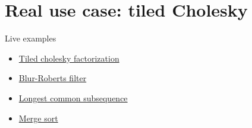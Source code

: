 \documentclass{beamer}
\begin{document}
  


  
  
    


    
    
      

\section{Real use case: tiled Cholesky}

\begin{frame}{Live examples}
  \begin{itemize} 
    \item \href{https://maltezfaria.github.io/DataFlowTasks.jl/dev/examples/cholesky/cholesky/}{Tiled cholesky factorization}
    \item
    \href{https://maltezfaria.github.io/DataFlowTasks.jl/dev/examples/blur-roberts/blur-roberts/}{Blur-Roberts filter}
    \item
    \href{https://maltezfaria.github.io/DataFlowTasks.jl/dev/examples/lcs/lcs/}{Longest
    common subsequence}
    \item
    \href{https://maltezfaria.github.io/DataFlowTasks.jl/dev/examples/sort/sort/}{Merge sort}
  \end{itemize}
\end{frame}
\end{document}
